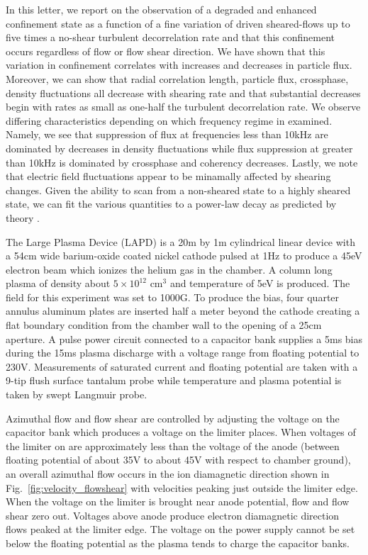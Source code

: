 \documentclass[%
 aps,
 prl,
 amsmath,amssymb,
 reprint,%
]{revtex4-1}
\begin{document}
In this letter, we report on the observation of a degraded and enhanced confinement state as a function of a fine variation of driven sheared-flows up to five times a no-shear turbulent decorrelation rate and that this confinement occurs regardless of flow or flow shear direction. We have shown that this variation in confinement correlates with increases and decreases in particle flux. Moreover, we can show that radial correlation length, particle flux, crossphase, density fluctuations all decrease with shearing rate and that substantial decreases begin with rates as small as one-half the turbulent decorrelation rate. We observe differing characteristics depending on which frequency regime in examined. Namely, we see that suppression of flux at frequencies less than 10kHz are dominated by decreases in density fluctuations while flux suppression at greater than 10kHz is dominated by crossphase and coherency decreases. Lastly, we note that electric field fluctuations appear to be minamally affected by shearing changes. Given the ability to scan from a non-sheared state to a highly sheared state, we can fit the various quantities to a power-law decay as predicted by theory \cite{biglari90}.

The Large Plasma Device \cite{gek91} (LAPD) is a 20m by 1m cylindrical linear device with a 54cm wide barium-oxide coated nickel cathode pulsed at 1Hz to produce a 45eV electron beam which ionizes the helium gas in the chamber. A column long plasma of density about $5 \times 10^{12}$ cm$^{3}$ and temperature of 5eV is produced. The field for this experiment was set to 1000G. To produce the bias, four quarter annulus aluminum plates are inserted half a meter beyond the cathode creating a flat boundary condition from the chamber wall to the opening of a 25cm aperture. A pulse power circuit connected to a capacitor bank supplies a 5ms bias during the 15ms plasma discharge with a voltage range from floating potential to 230V. Measurements of saturated current and floating potential are taken with a 9-tip flush surface tantalum probe while temperature and plasma potential is taken by swept Langmuir probe.

Azimuthal flow and flow shear are controlled by adjusting the voltage on the capacitor bank which produces a voltage on the limiter places. When voltages of the limiter on are approximately less than the voltage of the anode (between floating potential of about 35V to about 45V with respect to chamber ground), an overall azimuthal flow occurs in the ion diamagnetic direction shown in
Fig.~\ref{fig:velocity_flowshear}
with velocities peaking just outside the limiter edge. When the voltage on the limiter is brought near anode potential, flow and flow shear zero out. Voltages above anode produce electron diamagnetic direction flows peaked at the limiter edge. The voltage on the power supply cannot be set below the floating potential as the plasma tends to charge the capacitor banks.
\end{document}
